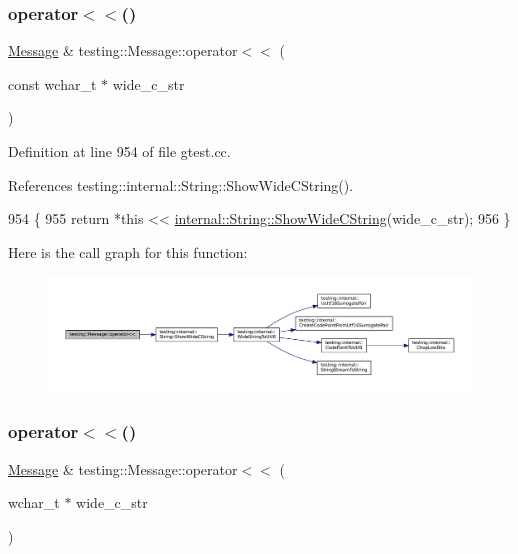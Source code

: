 \subsubsection{\texorpdfstring{operator$<$$<$()}{operator<<()}\hspace{0.1cm}{\footnotesize\ttfamily [5/6]}}
{\footnotesize\ttfamily \hyperlink{classtesting_1_1Message}{Message} \& testing\+::\+Message\+::operator$<$$<$ (\begin{DoxyParamCaption}\item[{const wchar\+\_\+t $\ast$}]{wide\+\_\+c\+\_\+str }\end{DoxyParamCaption})}



Definition at line 954 of file gtest.\+cc.



References testing\+::internal\+::\+String\+::\+Show\+Wide\+C\+String().


\begin{DoxyCode}
954                                                        \{
955   \textcolor{keywordflow}{return} *\textcolor{keyword}{this} << \hyperlink{classtesting_1_1internal_1_1String_aaf7e376ff580677ea4954d5913d5b917}{internal::String::ShowWideCString}(wide\_c\_str);
956 \}
\end{DoxyCode}
Here is the call graph for this function\+:
\nopagebreak
\begin{figure}[H]
\begin{center}
\leavevmode
\includegraphics[width=350pt]{classtesting_1_1Message_ac0db9c22535b28bc863bfd0a1fdf7e14_cgraph}
\end{center}
\end{figure}
\mbox{\label{classtesting_1_1Message_ac1d3a041ac4bb9c929ee746b31a13d6a}} 
\subsubsection{\texorpdfstring{operator$<$$<$()}{operator<<()}\hspace{0.1cm}{\footnotesize\ttfamily [6/6]}}
{\footnotesize\ttfamily \hyperlink{classtesting_1_1Message}{Message} \& testing\+::\+Message\+::operator$<$$<$ (\begin{DoxyParamCaption}\item[{wchar\+\_\+t $\ast$}]{wide\+\_\+c\+\_\+str }\end{DoxyParamCaption})}



